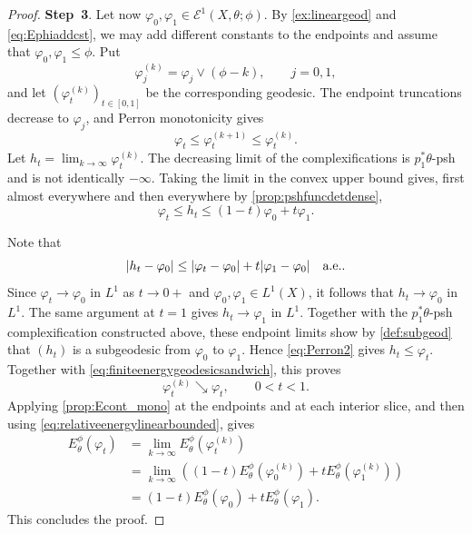\begin{proof}
    \textbf{Step~3}. Let now $\varphi_0,\varphi_1\in\mathcal E^1(X,\theta;\phi)$. By \cref{ex:lineargeod} and \eqref{eq:Ephiaddcst}, we may add different constants to the endpoints and assume that $\varphi_0,\varphi_1\leq\phi$. Put
    \[
        \varphi_j^{(k)}=\varphi_j\lor(\phi-k),\qquad j=0,1,
    \]
    and let $(\varphi_t^{(k)})_{t\in[0,1]}$ be the corresponding geodesic. The endpoint truncations decrease to $\varphi_j$, and Perron monotonicity gives
    \[
        \varphi_t\leq\varphi_t^{(k+1)}\leq\varphi_t^{(k)}.
    \]
    Let $h_t=\lim_{k\to\infty}\varphi_t^{(k)}$. The decreasing limit of the complexifications is $p_1^*\theta$-psh and is not identically $-\infty$. Taking the limit in the convex upper bound gives, first almost everywhere and then everywhere by \cref{prop:pshfuncdetdense},
    \begin{equation}\label{eq:finiteenergygeodesicsandwich}
        \varphi_t\leq h_t\leq(1-t)\varphi_0+t\varphi_1.
    \end{equation}

    Note that
    \[
        |h_t-\varphi_0|
        \leq|\varphi_t-\varphi_0|+t|\varphi_1-\varphi_0|\quad \textup{a.e.}.
    \]
    Since $\varphi_t\to\varphi_0$ in $L^1$ as $t\to0+$ and $\varphi_0,\varphi_1\in L^1(X)$, it follows that $h_t\to\varphi_0$ in $L^1$. The same argument at $t=1$ gives $h_t\to\varphi_1$ in $L^1$. Together with the $p_1^*\theta$-psh complexification constructed above, these endpoint limits show by \cref{def:subgeod} that $(h_t)$ is a subgeodesic from $\varphi_0$ to $\varphi_1$. Hence \eqref{eq:Perron2} gives $h_t\leq\varphi_t$. Together with \eqref{eq:finiteenergygeodesicsandwich}, this proves
    \[
        \varphi_t^{(k)}\searrow\varphi_t,\qquad 0<t<1.
    \]
    Applying \cref{prop:Econt_mono} at the endpoints and at each interior slice, and then using \eqref{eq:relativeenergylinearbounded}, gives
    \[
        \begin{aligned}
        E_\theta^\phi(\varphi_t)
        &=\lim_{k\to\infty}E_\theta^\phi(\varphi_t^{(k)})\\
        &=\lim_{k\to\infty}\left((1-t)E_\theta^\phi(\varphi_0^{(k)})
        +tE_\theta^\phi(\varphi_1^{(k)})\right)\\
        &=(1-t)E_\theta^\phi(\varphi_0)+tE_\theta^\phi(\varphi_1).
        \end{aligned}
    \]
    This concludes the proof.
\end{proof}

